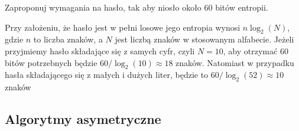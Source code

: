 \documentclass[answers,11pt]{exam}
\begin{document}
\begin{questions}
\question Zaproponuj wymagania na hasło, tak aby niosło około 60 bitów entropii.
\begin{solution}
Przy założeniu, że hasło jest w pełni losowe jego entropia wynosi $n \log_2(N)$, gdzie $n$ to liczba znaków, a $N$ jest liczbą znaków w stosowanym alfabecie. Jeżeli przyjmiemy hasło składające się z samych cyfr, czyli $N=10$, aby otrzymać 60 bitów potrzebnych będzie $60/\log_2(10) \approx 18$ znaków. Natomiast w przypadku hasła składającego się z małych i dużych liter, będzie to $60/\log_2(52) \approx 10 $ znaków
\end{solution}


\end{questions}


\subsection{Algorytmy asymetryczne}
\end{document}
